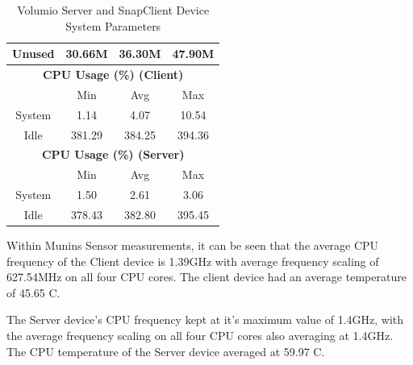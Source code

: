 \documentclass[11pt,a4paper]{scrreprt}
\begin{document}
\begin{table}[H]
\begin{tabular}{||c|c|c|c|c|c|c||}
    \hline
    Unused & \multicolumn{2}{|c|}{30.66M} & \multicolumn{2}{|c|}{36.30M} & \multicolumn{2}{|c|}{47.90M} \\
    \hline\hline
    \multicolumn{7}{|c|}{\textbf{CPU Usage (\%) (Client)}} \\
    \hline\hline
      & \multicolumn{2}{|c|}{Min} & \multicolumn{2}{|c|}{Avg} & \multicolumn{2}{|c|}{Max} \\
    \hline
    System & \multicolumn{2}{|c|}{1.14} & \multicolumn{2}{|c|}{4.07} & \multicolumn{2}{|c|}{10.54} \\
    \hline
    Idle & \multicolumn{2}{|c|}{381.29} & \multicolumn{2}{|c|}{384.25} & \multicolumn{2}{|c|}{394.36} \\
    \hline\hline
    \multicolumn{7}{|c|}{\textbf{CPU Usage (\%) (Server)}} \\
    \hline\hline
      & \multicolumn{2}{|c|}{Min} & \multicolumn{2}{|c|}{Avg} & \multicolumn{2}{|c|}{Max} \\
    \hline
    System & \multicolumn{2}{|c|}{1.50} & \multicolumn{2}{|c|}{2.61} & \multicolumn{2}{|c|}{3.06} \\
    \hline
    Idle & \multicolumn{2}{|c|}{378.43} & \multicolumn{2}{|c|}{382.80} & \multicolumn{2}{|c|}{395.45} \\
    \hline\hline
    \end{tabular}
    \caption{Volumio Server and SnapClient Device System Parameters}
    \label{VolumioclientserverSysTab}
\end{table}

Within Munins Sensor measurements, it can be seen that the average CPU
frequency of the Client device is 1.39GHz with average frequency scaling
of 627.54MHz on all four CPU cores. The client device had an average
temperature of 45.65 \degree C.

The Server device's CPU frequency kept at it's maximum value of 1.4GHz,
with the average frequency scaling on all four CPU cores also averaging
at 1.4GHz. The CPU temperature of the Server device averaged at 59.97
\degree C.
\end{document}
